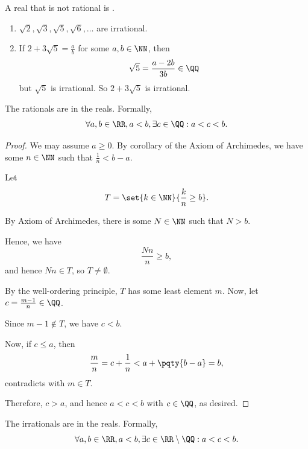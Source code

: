 \begin{definition}
    A real that is not rational is .
\end{definition}

\begin{examples}
    \begin{enumerate}
        \item \(\sqrt{2}, \sqrt{3}, \sqrt{5}, \sqrt{6}, \ldots\) are irrational.
        \item If \(2 + 3 \sqrt{5} = \frac{a}{b}\) for some \(a, b \in \NN\), then
        \[
            \sqrt{5} = \frac{a - 2b}{3b} \in \QQ
        \]
        but \(\sqrt{5}\) is irrational. So \(2 + 3 \sqrt{5}\) is irrational.
    \end{enumerate}
\end{examples}

\begin{proposition}[\(\QQ\) is dense in \(\RR\)]
    The rationals are  in the reals. Formally,
    \[
        \forall a, b \in \RR, a < b, \exists c \in \QQ: a < c < b.
    \]
\end{proposition}

\begin{proof}
    We may assume \(a \geq 0\). By corollary of the Axiom of Archimedes, we have some \(n \in \NN\) such that \(\frac{1}{n} < b - a\).

    Let
    \[
        T = \set{k \in \NN}{\frac{k}{n} \geq b}.
    \]

    By Axiom of Archimedes, there is some \(N \in \NN\) such that \(N > b\).
    
    Hence, we have
    \[
        \frac{Nn}{n} \geq b,
    \]
    and hence \(Nn \in T\), so \(T \neq \emptyset\).

    By the well-ordering principle, \(T\) has some least element \(m\). Now, let \(c = \frac{m - 1}{n} \in \QQ\).

    Since \(m - 1 \notin T\), we have \(c < b\).

    Now, if \(c \leq a\), then
    \[
        \frac{m}{n} = c + \frac{1}{n} < a + \pqty{b - a} = b,
    \]
    contradicts with \(m \in T\).

    Therefore, \(c > a\), and hence \(a < c < b\) with \(c \in \QQ\), as desired.
\end{proof}

\begin{proposition}
    The irrationals are  in the reals. Formally,
    \[
        \forall a, b \in \RR, a < b, \exists c \in \RR \setminus \QQ: a < c < b.
    \]
\end{proposition}


